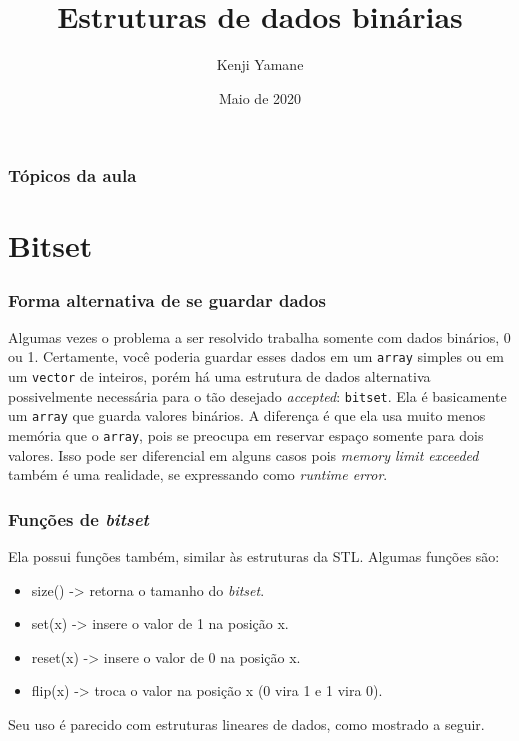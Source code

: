 \documentclass{beamer}
\title[Apresentação]{Estruturas de dados binárias}
\author[\textit{Kenji Yamane}]{Kenji Yamane}
\date{Maio de 2020}
\begin{document}
\begin{frame}

\titlepage


\end{frame}

\begin{frame}

\frametitle{Tópicos da aula}

\tableofcontents

\end{frame}

\section{Bitset}
	
	\begin{frame}
	\frametitle{Forma alternativa de se guardar dados}
		Algumas vezes o problema a ser resolvido trabalha somente com dados binários, 0 ou 1. Certamente, você poderia guardar esses dados em um \texttt{array} simples ou em um \texttt{vector} de inteiros, porém há uma estrutura de dados alternativa possivelmente necessária para o tão desejado \textit{accepted}: \texttt{bitset}. Ela é basicamente um \texttt{array} que guarda valores binários. A diferença é que ela usa muito menos memória que o \texttt{array}, pois se preocupa em reservar espaço somente para dois valores. Isso pode ser diferencial em alguns casos pois \textit{memory limit exceeded} também é uma realidade, se expressando como \textit{runtime error}.
	\end{frame}

	\begin{frame}
	\frametitle{Funções de \textit{bitset}}
		Ela possui funções também, similar às estruturas da STL. Algumas funções são:

		\begin{itemize}
			\item size() -> retorna o tamanho do \textit{bitset}.
			\item set(x) -> insere o valor de 1 na posição x.
			\item reset(x) -> insere o valor de 0 na posição x.
			\item flip(x) -> troca o valor na posição x (0 vira 1 e 1 vira 0).
		\end{itemize}
		Seu uso é parecido com estruturas lineares de dados, como mostrado a seguir.
	\end{frame}
\end{document}
